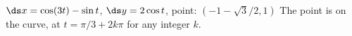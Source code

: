 {$\ds x=\cos(3t)-\sin t$, \quad $\ds y=2\cos t$, \quad point: $\left(-1-\sqrt{3}/2,1\right)$
}
{The point is on the curve, at $t=\pi/3+2k\pi$ for any integer $k$.
}